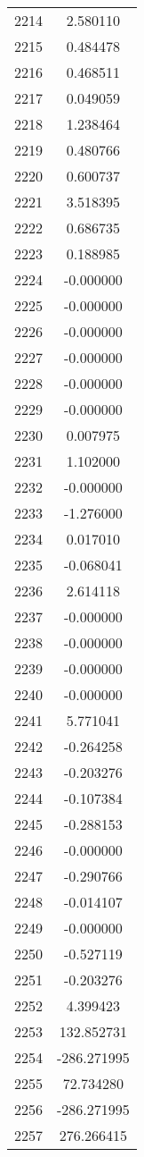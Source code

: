 \documentclass[12pt]{article}
\begin{document}
\begin{longtable}{@{}cc@{}}
2214 & 2.580110 \\
2215 & 0.484478 \\
2216 & 0.468511 \\
2217 & 0.049059 \\
2218 & 1.238464 \\
2219 & 0.480766 \\
2220 & 0.600737 \\
2221 & 3.518395 \\
2222 & 0.686735 \\
2223 & 0.188985 \\
2224 & -0.000000 \\
2225 & -0.000000 \\
2226 & -0.000000 \\
2227 & -0.000000 \\
2228 & -0.000000 \\
2229 & -0.000000 \\
2230 & 0.007975 \\
2231 & 1.102000 \\
2232 & -0.000000 \\
2233 & -1.276000 \\
2234 & 0.017010 \\
2235 & -0.068041 \\
2236 & 2.614118 \\
2237 & -0.000000 \\
2238 & -0.000000 \\
2239 & -0.000000 \\
2240 & -0.000000 \\
2241 & 5.771041 \\
2242 & -0.264258 \\
2243 & -0.203276 \\
2244 & -0.107384 \\
2245 & -0.288153 \\
2246 & -0.000000 \\
2247 & -0.290766 \\
2248 & -0.014107 \\
2249 & -0.000000 \\
2250 & -0.527119 \\
2251 & -0.203276 \\
2252 & 4.399423 \\
2253 & 132.852731 \\
2254 & -286.271995 \\
2255 & 72.734280 \\
2256 & -286.271995 \\
2257 & 276.266415 \\

\end{longtable}
\end{document}
